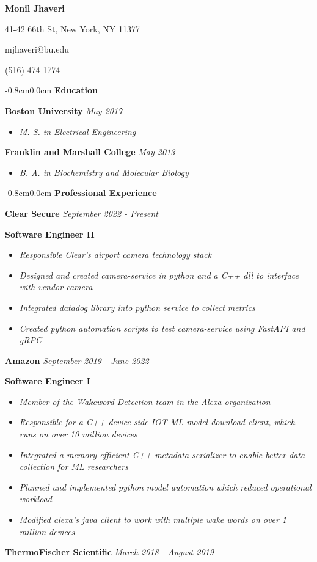 \documentclass[8pt]{extarticle}
\begin{document}
\begin{center} 
\large \textbf{Monil Jhaveri}


41-42 66th St, New York, NY 11377

mjhaveri@bu.edu 

(516)-474-1774 
\end{center} 
\begin{changemargin}{-0.8cm}{0.0cm}
\textbf{Education}
\end{changemargin}
\vspace*{-0.4cm}
\makebox[\linewidth]{\rule{17cm}{0.4pt}}
\textbf{Boston University} \textit{May 2017}
\begin{itemize}
\item \textit{M. S. in Electrical Engineering}
\end{itemize}
\textbf{Franklin and Marshall College} \textit{May 2013}
\begin{itemize}
\item \textit{B. A. in Biochemistry and Molecular Biology }

\end{itemize}
\begin{changemargin}{-0.8cm}{0.0cm}
	\textbf{Professional Experience}
\end{changemargin}
\vspace*{-0.4cm}
\makebox[\linewidth]{\rule{17cm}{0.4pt}}
\textbf{Clear Secure} \hfill\textit{September 2022 - Present}

{\tiny }
\textbf{Software Engineer II}
\begin{itemize}
	\item \textit{Responsible Clear's airport camera technology stack}
	\item \textit{Designed and created camera-service in python and a C++ dll to interface with vendor camera}
	\item \textit{Integrated datadog library into python service to collect metrics}
		\item \textit{Created python automation scripts to test camera-service using FastAPI and gRPC}
\end{itemize}
\textbf{Amazon} \hfill\textit{September 2019 - June 2022}

{\tiny }
\textbf{Software Engineer I}
\begin{itemize}
	\item \textit{Member of the Wakeword Detection team in the Alexa organization}
	\item \textit{Responsible for a C++ device side IOT ML model download client, which runs on over 10 million devices}
	\item \textit{Integrated a memory efficient C++ metadata serializer to enable better data collection for ML researchers}
	\item \textit{Planned and implemented python model automation which reduced operational workload}	\item \textit{Modified alexa's  java client to work with multiple wake words on over 1 million devices}
\end{itemize}
\textbf{ThermoFischer Scientific} \hfill\textit{March 2018 - August 2019}
\end{document}
